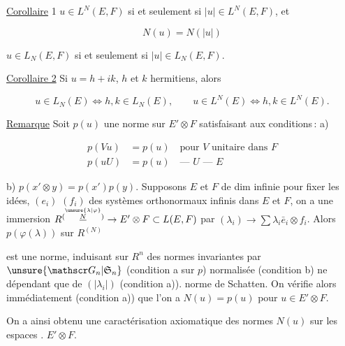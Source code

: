 
\uline{Corollaire} 1 $u\in L^N(E,F)$ si et seulement si $|u|\in L^N(E,F)$, et

\[
N(u)=N(|u|)
\]

$u\in L_N(E,F)$ si et seulement si $|u|\in L_N(E,F)$.


\uline{Corollaire 2} Si $u=h+ik$, $h$ et $k$ hermitiens, alors

\[
u\in L_N(E)\Longleftrightarrow h,k\in L_N(E),\qquad
u\in L^N(E)\Longleftrightarrow h,k\in L^N(E).
\]

\uline{Remarque} Soit $p(u)$ une norme sur $E'\otimes F$ satisfaisant aux conditions\,: a)

\[
\begin{aligned}
p(Vu)&=p(u)\quad\text{pour $V$ unitaire dans $F$}\\
p(uU)&=p(u)\quad\text{--- $U$ --- $E$}
\end{aligned}
\]

b) $p(x'\otimes y)=p(x')p(y)$. Supposons $E$ et $F$ de dim infinie pour fixer les idées,  $(e_i)$ $(f_i)$ des systèmes orthonormaux infinis dans $E$ et $F$, on a une immersion $R^{(\overset{\unsure{\lambda|\varphi}}{\underline N})}\to E'\otimes F\subset L(E,F)$ par $(\lambda_i)\to\sum\lambda_i\bar e_i\otimes f_i$. Alors $p(\varphi(\lambda))$ sur $R^{(N)}$

est une norme, induisant sur $R^n$ des normes  invariantes par $\unsure{\mathscr G_n|\mathfrak S_n}$ (condition a sur $p$) normalisée (condition b) ne dépendant que de $(|\lambda_i|)$ (condition a)).   norme de Schatten. On vérifie alors immédiatement (condition a)) que l'on a $N(u)=p(u)$ pour  $u\in E'\otimes F$.

On a ainsi obtenu une caractérisation axiomatique des normes $N(u)$ sur les espaces . $E'\otimes F$.

